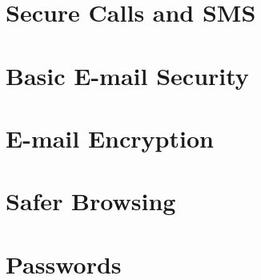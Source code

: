 \documentclass[oribibl,a4paper]{book}
\begin{document}
\chapter{Secure Calls and SMS}

\clearpage

\clearpage
\graphicspath{{./chapter_05_basic_email_security/}}
\chapter{Basic E-mail Security}

\clearpage

\clearpage

\clearpage
\graphicspath{{./chapter_06_email_encryption/}}
\chapter{E-mail Encryption}

\clearpage

\clearpage

\clearpage

\clearpage

\clearpage

\clearpage

\clearpage

\clearpage
\graphicspath{{./chapter_07_safer_browsing/}}
\chapter{Safer Browsing}

\clearpage

\clearpage

\clearpage

\clearpage

\clearpage

\clearpage

\clearpage
\graphicspath{{./chapter_08_passwords/}}
\chapter{Passwords}

\clearpage

\clearpage

\clearpage
\graphicspath{{./chapter_09_using_vpn/}}
\end{document}
